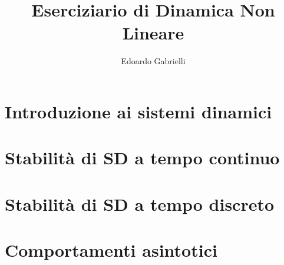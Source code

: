 
\author{Edoardo Gabrielli}
\title{Eserciziario di Dinamica Non Lineare}

\maketitle 
\tableofcontents
\chapter{Introduzione ai sistemi dinamici}


\setcounter{section}{3}

\setcounter{section}{5}



\chapter{Stabilità di SD a tempo continuo}





\setcounter{section}{6}





\chapter{Stabilità di SD a tempo discreto}

\chapter{Comportamenti asintotici}%



